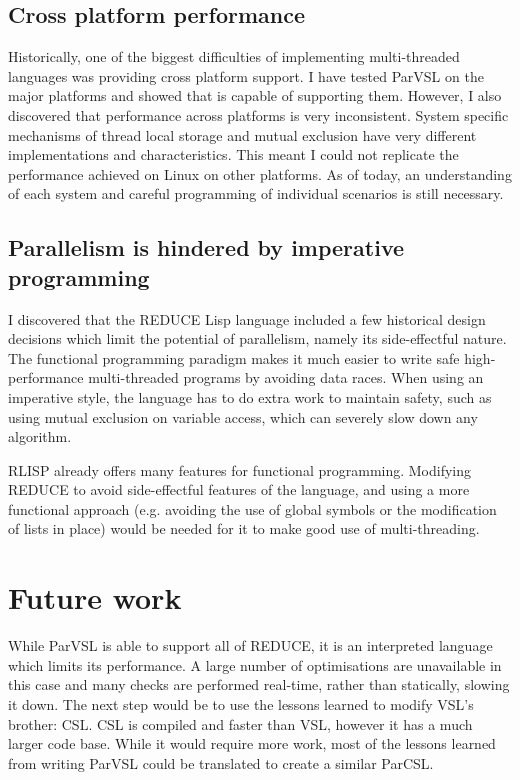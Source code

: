 \subsection{Cross platform performance}

Historically, one of the biggest difficulties of implementing multi-threaded languages
was providing cross platform support. I have tested ParVSL on the major platforms and
showed that is capable of supporting them. However, I also discovered that performance
across platforms is very inconsistent. System specific mechanisms of thread local storage
and mutual exclusion have very different implementations and characteristics. This meant
I could not replicate the performance achieved on Linux on other platforms. As of today,
an understanding of each system and careful programming of individual scenarios is still
necessary.

\subsection{Parallelism is hindered by imperative programming}

I discovered that the REDUCE Lisp language included a few historical design decisions which
limit the potential of parallelism, namely its side-effectful nature. The functional programming
paradigm makes it much easier to write safe high-performance multi-threaded programs by avoiding
data races. When using an imperative style, the language has to do extra work to maintain safety,
such as using mutual exclusion on variable access, which can severely slow down any algorithm.

RLISP already offers many features for functional programming.
Modifying REDUCE to avoid side-effectful features of the language, and using a more
functional approach (e.g. avoiding the use of global symbols or the modification
of lists in place) would be needed for it to make good use of multi-threading.

\section{Future work}

While ParVSL is able to support all of REDUCE, it is an interpreted language
which limits its performance. A large number of optimisations are unavailable in this
case and many checks are performed real-time, rather than statically, slowing it down.
The next step would be to use the lessons learned to modify VSL's brother: CSL.
CSL is compiled and faster than VSL, however it has a much larger code base.
While it would require more work, most of the lessons learned from writing ParVSL could be translated
to create a similar ParCSL.

